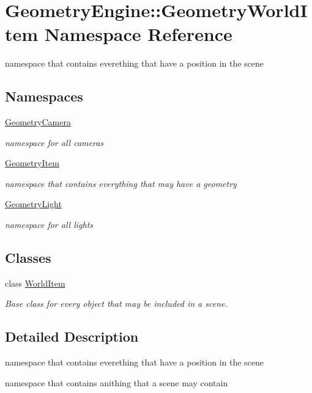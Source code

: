 \hypertarget{namespace_geometry_engine_1_1_geometry_world_item}{}\section{Geometry\+Engine\+::Geometry\+World\+Item Namespace Reference}
\label{namespace_geometry_engine_1_1_geometry_world_item}


namespace that contains everething that have a position in the scene  


\subsection*{Namespaces}
\begin{DoxyCompactItemize}
\item 
 \mbox{\hyperlink{namespace_geometry_engine_1_1_geometry_world_item_1_1_geometry_camera}{Geometry\+Camera}}
\begin{DoxyCompactList}\small\item\em namespace for all cameras \end{DoxyCompactList}\item 
 \mbox{\hyperlink{namespace_geometry_engine_1_1_geometry_world_item_1_1_geometry_item}{Geometry\+Item}}
\begin{DoxyCompactList}\small\item\em namespace that contains everything that may have a geometry \end{DoxyCompactList}\item 
 \mbox{\hyperlink{namespace_geometry_engine_1_1_geometry_world_item_1_1_geometry_light}{Geometry\+Light}}
\begin{DoxyCompactList}\small\item\em namespace for all lights \end{DoxyCompactList}\end{DoxyCompactItemize}
\subsection*{Classes}
\begin{DoxyCompactItemize}
\item 
class \mbox{\hyperlink{class_geometry_engine_1_1_geometry_world_item_1_1_world_item}{World\+Item}}
\begin{DoxyCompactList}\small\item\em Base class for every object that may be included in a scene. \end{DoxyCompactList}\end{DoxyCompactItemize}


\subsection{Detailed Description}
namespace that contains everething that have a position in the scene 

namespace that contains anithing that a scene may contain 